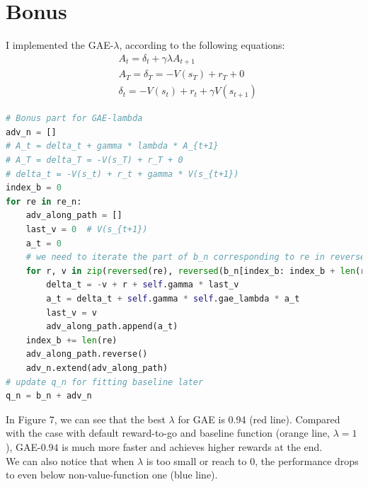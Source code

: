 \documentclass[12pt]{article}
\begin{document}
\newpage
\section*{Bonus}
I implemented the GAE-$\lambda$, according to the following equations:
\begin{align*}
& A_t = \delta_t + \gamma \lambda A_{t+1} \\
& A_T = \delta_T = -V(s_T) + r_T + 0 \\
& \delta_t = -V(s_t) + r_t + \gamma V(s_{t+1})
\end{align*}
\begin{lstlisting}[language=python]
# Bonus part for GAE-lambda
adv_n = []
# A_t = delta_t + gamma * lambda * A_{t+1}
# A_T = delta_T = -V(s_T) + r_T + 0
# delta_t = -V(s_t) + r_t + gamma * V(s_{t+1})
index_b = 0
for re in re_n:
    adv_along_path = []
    last_v = 0  # V(s_{t+1})
    a_t = 0
    # we need to iterate the part of b_n corresponding to re in reversed order
    for r, v in zip(reversed(re), reversed(b_n[index_b: index_b + len(re)])):
        delta_t = -v + r + self.gamma * last_v
        a_t = delta_t + self.gamma * self.gae_lambda * a_t
        last_v = v
        adv_along_path.append(a_t)
    index_b += len(re)
    adv_along_path.reverse()
    adv_n.extend(adv_along_path)
# update q_n for fitting baseline later
q_n = b_n + adv_n
\end{lstlisting}
In Figure 7, we can see that the best $\lambda$ for GAE is 0.94 (red line). Compared with the case with default reward-to-go and baseline function (orange line, $\lambda=1$), GAE-$0.94$ is much more faster and achieves higher rewards at the end. \\
We can also notice that when $\lambda$ is too small or reach to $0$, the performance drops to even below non-value-function one (blue line).
\end{document}
